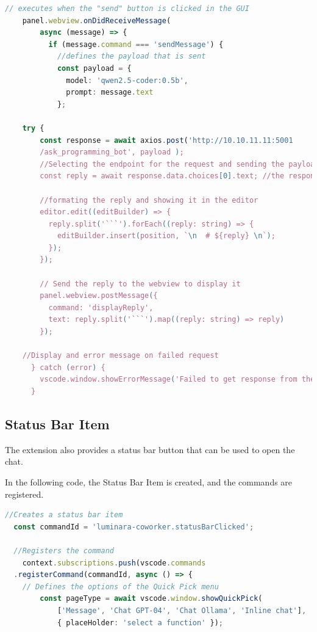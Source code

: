 \begin{lstlisting}[language=TypeScript, caption={Axios request}]
    // executes when the "send" button is clicked in the GUI
    panel.webview.onDidReceiveMessage(
        async (message) => {
          if (message.command === 'sendMessage') {
            //defines the payload that is sent
            const payload = {
              model: 'qwen2.5-coder:0.5b',
              prompt: message.text
            };  

    try {
        const response = await axios.post('http://10.10.11.11:5001
        /ask_programming_bot', payload ); 
        //Selecting the endpoint for the request and sending the payload. 
        const reply = await response.data.choices[0].text; //the response is then stored in the "reply" variable

        //formating the reply and showing it in the editor
        editor.edit((editBuilder) => {
          reply.split('```').forEach((reply: string) => {
            editBuilder.insert(position, `\n  # ${reply} \n`);
          });
        });

        // Send the reply to the webview to display it
        panel.webview.postMessage({
          command: 'displayReply',
          text: reply.split('```').map((reply: string) => reply)
        });

    //Display and error message on failed request
      } catch (error) {
        vscode.window.showErrorMessage('Failed to get response from the server.');
      }

\end{lstlisting}

\subsection{Status Bar Item} 

The extension also provides a status bar button that can be used to open the chat.

In the following code, the Status Bar Item is created, and the commands are registered.

\begin{lstlisting}[language=TypeScript, caption={Status Bar}]
  //Creates a status bar item
  const commandId = 'luminara-coworker.statusBarClicked';

  //Registers the command
	context.subscriptions.push(vscode.commands
  .registerCommand(commandId, async () => {
    // Defines the options of the Quick Pick menu
		const pageType = await vscode.window.showQuickPick(
			['Message', 'Chat GPT-04', 'Chat Ollama', 'Inline chat'],
			{ placeHolder: 'select a function' });
\end{lstlisting}

